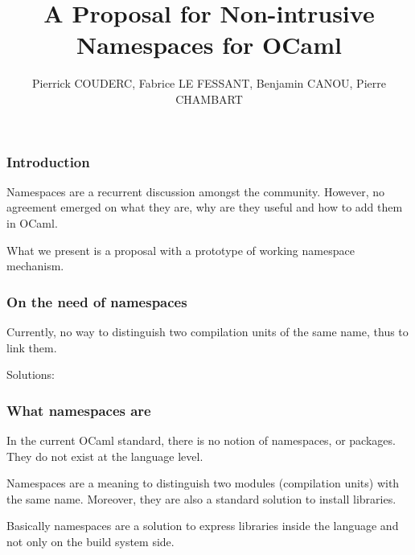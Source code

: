 \documentclass{beamer}
\author{Pierrick COUDERC, Fabrice LE FESSANT, Benjamin CANOU, Pierre CHAMBART}
\title{A Proposal for Non-intrusive Namespaces for OCaml}
\begin{document}
\maketitle

\begin{frame}
\frametitle{Introduction}

Namespaces are a recurrent discussion amongst the community. However, no
agreement emerged on what they are, why are they useful and how to add them in
OCaml.

\medskip

What we present is a proposal with a prototype of working namespace mechanism.
\end{frame}

\begin{frame}[fragile]
\frametitle{On the need of namespaces}



Currently, no way to distinguish two compilation units of the same name, thus to
link them.

Solutions: 
\begin{itemize}
\end{itemize}
\end{frame}




\begin{frame}
\frametitle{What namespaces are}

In the current OCaml standard, there is no notion of namespaces, or
packages. They do not exist at the language level.

\medskip

Namespaces are a meaning to distinguish two modules (compilation units) with the
same name. Moreover, they are also a standard solution to install libraries.

\medskip

Basically namespaces are a solution to express libraries inside the language and
not only on the build system side. 

\end{frame}
\end{document}
